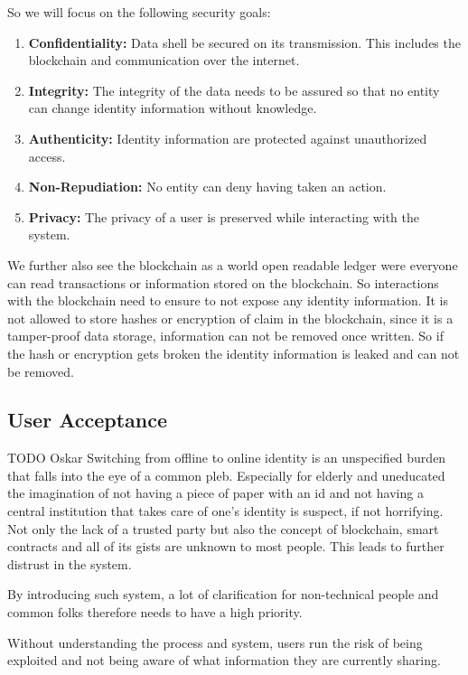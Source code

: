 So we will focus on the following security goals:
\begin{enumerate}
\item \textbf{Confidentiality:} Data shell be secured on its transmission. This includes the blockchain and communication over the internet. 
\item \textbf{Integrity:} The integrity of the data needs to be assured so that no entity can change identity information without knowledge. 
\item \textbf{Authenticity:} Identity information are protected against unauthorized access. 
\item \textbf{Non-Repudiation:} No entity can deny having taken an action.
\item \textbf{Privacy:} The privacy of a user is preserved while interacting with the system. 
\end{enumerate}

We further also see the blockchain as a world open readable ledger were everyone can read transactions or information stored on the blockchain. So interactions with the blockchain need to ensure to not expose any identity information. 
It is not allowed to store hashes or encryption of claim in the blockchain, since it is a tamper-proof data storage, information can not be removed once written. So if the hash or encryption gets broken the identity information is leaked and can not be removed.  

\subsection{User Acceptance}
\label{sec:userAcceptance}

TODO Oskar
Switching from offline to online identity is an unspecified burden that falls into the eye of a common pleb.
Especially for elderly and uneducated the imagination of not having a piece of paper with an id and not having a central
institution that takes care of one's identity is suspect, if not horrifying.
Not only the lack of a trusted party but also the concept of blockchain, smart contracts and all of its gists are unknown
to most people. This leads to further distrust in the system.

By introducing such system, a lot of clarification for non-technical people and common folks therefore needs to have a
high priority.

Without understanding the process and system, users run the risk of being exploited and not being aware of what information
they are currently sharing.

